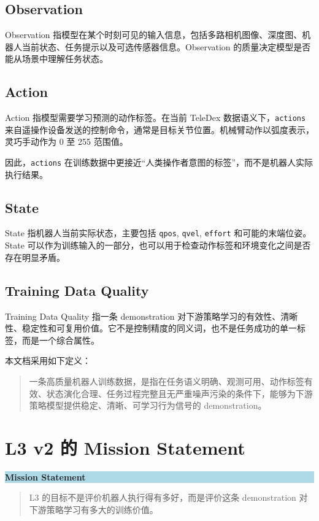 \documentclass[UTF8,zihao=-4,oneside,openany]{ctexrep}
\newenvironment{principlebox}[1]{\vspace{0.5em}\noindent\colorbox{LightBlue}{\parbox{0.96\linewidth}{\textbf{#1}}}\par\vspace{-0.2em}\begin{quote}\small}{\end{quote}\vspace{0.3em}}
\begin{document}
\subsection{Observation}

Observation 指模型在某个时刻可见的输入信息，包括多路相机图像、深度图、机器人当前状态、任务提示以及可选传感器信息。Observation 的质量决定模型是否能从场景中理解任务状态。

\subsection{Action}

Action 指模型需要学习预测的动作标签。在当前 TeleDex 数据语义下，\texttt{actions} 来自遥操作设备发送的控制命令，通常是目标关节位置。机械臂动作以弧度表示，灵巧手动作为 0 至 255 范围值。

因此，\texttt{actions} 在训练数据中更接近“人类操作者意图的标签”，而不是机器人实际执行结果。

\subsection{State}

State 指机器人当前实际状态，主要包括 \texttt{qpos}, \texttt{qvel}, \texttt{effort} 和可能的末端位姿。State 可以作为训练输入的一部分，也可以用于检查动作标签和环境变化之间是否存在明显矛盾。

\subsection{Training Data Quality}

Training Data Quality 指一条 demonstration 对下游策略学习的有效性、清晰性、稳定性和可复用价值。它不是控制精度的同义词，也不是任务成功的单一标签，而是一个综合属性。

本文档采用如下定义：

\begin{quote}
一条高质量机器人训练数据，是指在任务语义明确、观测可用、动作标签有效、状态演化合理、任务过程完整且无严重噪声污染的条件下，能够为下游策略模型提供稳定、清晰、可学习行为信号的 demonstration。
\end{quote}

\section{L3 v2 的 Mission Statement}

\begin{principlebox}{Mission Statement}
L3 的目标不是评价机器人执行得有多好，而是评价这条 demonstration 对下游策略学习有多大的训练价值。
\end{principlebox}
\end{document}
